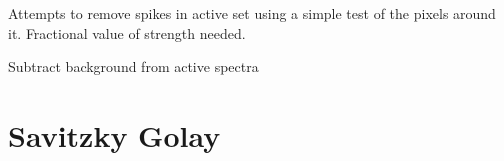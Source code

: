 \documentclass[letterpaper,10pt,english]{sphinxmanual}
\begin{document}
\begin{fulllineitems}
\begin{fulllineitems}
\label{spectra:spectra.Spectra.remove_spikes}
Attempts to remove spikes in active set using a simple test of 
the pixels around it. Fractional value of strength needed.

\end{fulllineitems}


\begin{fulllineitems}
\label{spectra:spectra.Spectra.subtract_background}
Subtract background from active spectra

\end{fulllineitems}


\end{fulllineitems}



\chapter{Savitzky Golay}
\label{savitzky_golay:savitzky-golay}\label{savitzky_golay::doc}
\end{document}
